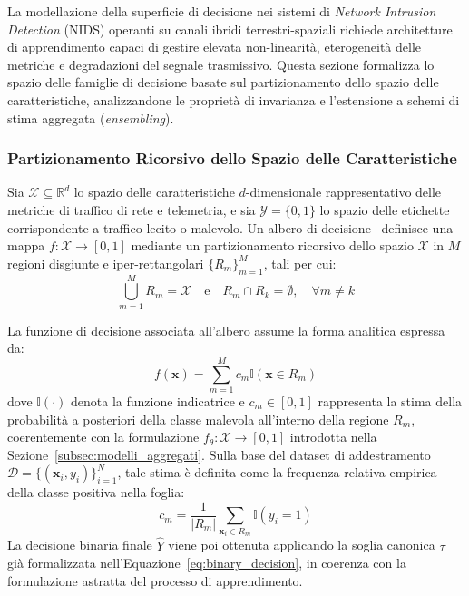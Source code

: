 La modellazione della superficie di decisione nei sistemi di \textit{Network Intrusion Detection} (NIDS) operanti su canali ibridi terrestri-spaziali richiede architetture di apprendimento capaci di gestire elevata non-linearità, eterogeneità delle metriche e degradazioni del segnale trasmissivo. Questa sezione formalizza lo spazio delle famiglie di decisione basate sul partizionamento dello spazio delle caratteristiche, analizzandone le proprietà di invarianza e l'estensione a schemi di stima aggregata (\textit{ensembling}).

\subsubsection{Partizionamento Ricorsivo dello Spazio delle Caratteristiche}
Sia $\mathcal{X} \subseteq \mathbb{R}^d$ lo spazio delle caratteristiche $d$-dimensionale rappresentativo delle metriche di traffico di rete e telemetria, e sia $\mathcal{Y} = \{0, 1\}$ lo spazio delle etichette corrispondente a traffico lecito o malevolo. Un albero di decisione~\cite{breiman1984} definisce una mappa $f: \mathcal{X} \to [0,1]$ mediante un partizionamento ricorsivo dello spazio $\mathcal{X}$ in $M$ regioni disgiunte e iper-rettangolari $\{R_m\}_{m=1}^M$, tali per cui:
\begin{equation}
    \bigcup_{m=1}^M R_m = \mathcal{X} \quad \text{e} \quad R_m \cap R_k = \emptyset, \quad \forall m \neq k
\end{equation}

La funzione di decisione associata all'albero assume la forma analitica espressa da:
\begin{equation}
    f(\mathbf{x}) = \sum_{m=1}^M c_m \mathbb{I}(\mathbf{x} \in R_m)
\end{equation}
dove $\mathbb{I}(\cdot)$ denota la funzione indicatrice e $c_m \in [0,1]$ rappresenta la stima della probabilità a posteriori della classe malevola all'interno della regione $R_m$, coerentemente con la formulazione $f_\theta: \mathcal{X} \to [0,1]$ introdotta nella Sezione~\ref{subsec:modelli_aggregati}. Sulla base del dataset di addestramento $\mathcal{D} = \{(\mathbf{x}_i, y_i)\}_{i=1}^N$, tale stima è definita come la frequenza relativa empirica della classe positiva nella foglia:
\begin{equation}
    c_m = \frac{1}{|R_m|} \sum_{\mathbf{x}_i \in R_m} \mathbb{I}(y_i = 1)
\end{equation}
La decisione binaria finale $\hat{Y}$ viene poi ottenuta applicando la soglia canonica $\tau$ già formalizzata nell'Equazione~\eqref{eq:binary_decision}, in coerenza con la formulazione astratta del processo di apprendimento.

